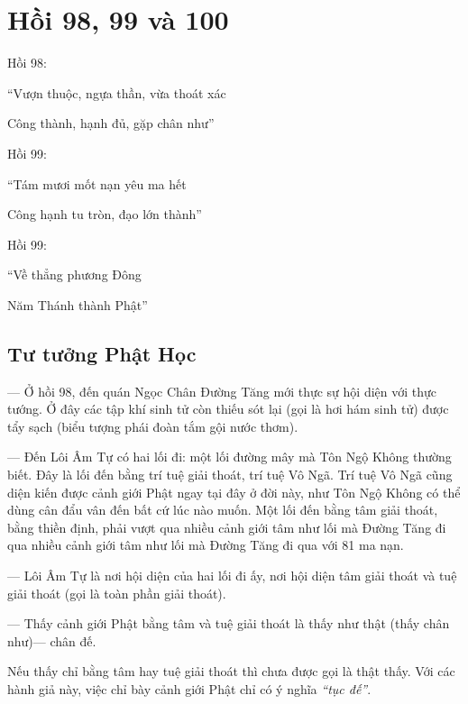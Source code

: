 \chapter{Hồi 98, 99 và 100} %
\label{cha:hoi_98_99_100}

Hồi 98:

\begin{itshape}
``Vượn thuộc, ngựa thần, vừa thoát xác

Công thành, hạnh đủ, gặp chân như''
\end{itshape}

Hồi 99:

\begin{itshape}
``Tám mươi mốt nạn yêu ma hết

Công hạnh tu tròn, đạo lớn thành''
\end{itshape}

Hồi 99:

\begin{itshape}
``Về thẳng phương Đông

Năm Thánh thành Phật''
\end{itshape}

\section{Tư tưởng Phật Học} %
\label{sec:98_99_100_phat_hoc}

— Ở hồi 98, đến quán Ngọc Chân Đường Tăng mới thực sự hội diện với thực tướng. Ở đây các tập khí sinh tử còn thiếu sót lại (gọi là hơi hám sinh tử) được tẩy sạch (biểu tượng phái đoàn tắm gội nước thơm).

— Đến Lôi Âm Tự có hai lối đi: một lối đường mây mà Tôn Ngộ Không thường biết. Đây là lối đến bằng trí tuệ giải thoát, trí tuệ Vô Ngã. Trí tuệ Vô Ngã cũng diện kiến được cảnh giới Phật ngay tại đây ở đời này, như Tôn Ngộ Không có thể dùng cân đẩu vân đến bất cứ lúc nào muốn. Một lối đến bằng tâm giải thoát, bằng thiền định, phải vượt qua nhiều cảnh giới tâm như lối mà Đường Tăng đi qua nhiều cảnh giới tâm như lối mà Đường Tăng đi qua với 81 ma nạn.

— Lôi Âm Tự là nơi hội diện của hai lối đi ấy, nơi hội diện tâm giải thoát và tuệ giải thoát (gọi là toàn phần giải thoát).

— Thấy cảnh giới Phật bằng tâm và tuệ giải thoát là thấy như thật (thấy chân như)— chân đế.

Nếu thấy chỉ bằng tâm hay tuệ giải thoát thì chưa được gọi là thật thấy. Với các hành giả này, việc chỉ bày cảnh giới Phật chỉ có ý nghĩa \emph{``tục đế''}.

